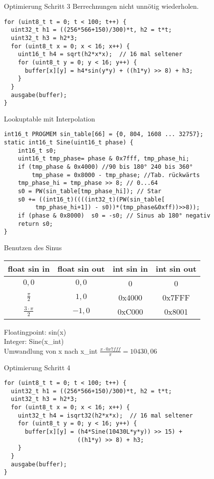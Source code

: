 \documentclass{beamer}
\begin{document}
\begin{frame}[fragile]{Optimierung Schritt 3}
Berrechnungen nicht unnötig wiederholen.
\begin{verbatim}
for (uint8_t t = 0; t < 100; t++) {
  uint32_t h1 = ((256*566+150)/300)*t, h2 = t*t; 
  uint32_t h3 = h2*3; 
  for (uint8_t x = 0; x < 16; x++) {
    uint16_t h4 = sqrt(h2*x*x);  // 16 mal seltener
    for (uint8_t y = 0; y < 16; y++) {
      buffer[x][y] = h4*sin(y*y) + ((h1*y) >> 8) + h3;
    }
  }
  ausgabe(buffer);
}
\end{verbatim}
\end{frame}

\begin{frame}[fragile]{Lookuptable mit Interpolation}
\begin{verbatim}
int16_t PROGMEM sin_table[66] = {0, 804, 1608 ... 32757};
static int16_t Sine(uint16_t phase) {
    int16_t s0;
    uint16_t tmp_phase= phase & 0x7fff, tmp_phase_hi;
    if (tmp_phase & 0x4000) //90 bis 180° 240 bis 360° 
        tmp_phase = 0x8000 - tmp_phase; //Tab. rückwärts
    tmp_phase_hi = tmp_phase >> 8; // 0...64
    s0 = PW(sin_table[tmp_phase_hi]); // Star
    s0 += ((int16_t)((((int32_t)(PW(sin_table[
         tmp_phase_hi+1]) - s0))*(tmp_phase&0xff))>>8));
    if (phase & 0x8000)  s0 = -s0; // Sinus ab 180° negativ
    return s0;
}
\end{verbatim}
\end{frame}

\begin{frame}[fragile]{Benutzen des Sinus}
\begin{tabular}[c] {cccc}
float sin in 	& float sin out  & int sin in & int sin out \\
\hline
$0,0$		& $0,0$	        	& 0        & 0 \\
$\frac{\pi}{2}$&$1,0$	        	& 0x4000   & 0x7FFF \\
$\frac{3\cdot\pi}{2}$&$-1,0$  	& 0xC000   & 0x8001 \\
\end{tabular}
\newline
Floatingpoint: sin(x) \\
Integer: Sine(x\_int) \\
Umwandlung von x nach x\_int $ \frac{x \cdot 0x7fff}{\pi} = 10430,06 $ 
\end{frame}

\begin{frame}[fragile]{Optimierung Schritt 4}
\begin{verbatim}
for (uint8_t t = 0; t < 100; t++) {
  uint32_t h1 = ((256*566+150)/300)*t, h2 = t*t; 
  uint32_t h3 = h2*3; 
  for (uint8_t x = 0; x < 16; x++) {
    uint32_t h4 = isqrt32(h2*x*x);  // 16 mal seltener
    for (uint8_t y = 0; y < 16; y++) {
      buffer[x][y] = (h4*Sine(10430L*y*y)) >> 15) + 
                     ((h1*y) >> 8) + h3;
    }
  }
  ausgabe(buffer);
}
\end{verbatim}
\end{frame}
\end{document}
